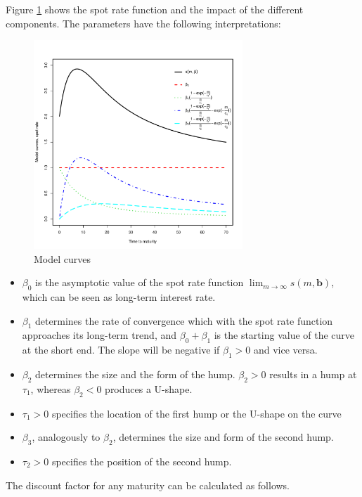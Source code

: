 Figure \ref{fig:modelcurves} shows the \cite{Svensson1994} spot rate function and the impact of the different components. The parameters have the following interpretations:

%

\begin{figure}[htb]
\centering
  \caption{Model curves}
 \label{fig:modelcurves}
\includegraphics[width=0.7\textwidth]{curveshape}
\end{figure}

\begin{itemize}
\item $\beta_0$ is the asymptotic value of the spot rate function $\lim_{m\to\infty}s(m,\bm{b})$, which can be seen as long-term interest rate.
\item $\beta_1$ determines the rate of convergence which with the spot rate function approaches its long-term trend, and $\beta_0+\beta_1$ is the starting value of the curve at the short end. The slope will be negative if $\beta_1>0$ and vice versa.
\item $\beta_2$ determines the size and the form of the hump. $\beta_2 >0$  results in a hump at  $\tau_1$, whereas $\beta_2<0$ produces a U-shape.
\item $\tau_1>0$ specifies the location of the first hump or the U-shape on the curve
\item $\beta_3$, analogously to $\beta_2$, determines the size and form of the second hump.
\item $\tau_2>0$ specifies the position of the second hump.
\end{itemize}

The discount factor for any maturity can be calculated as follows. 

